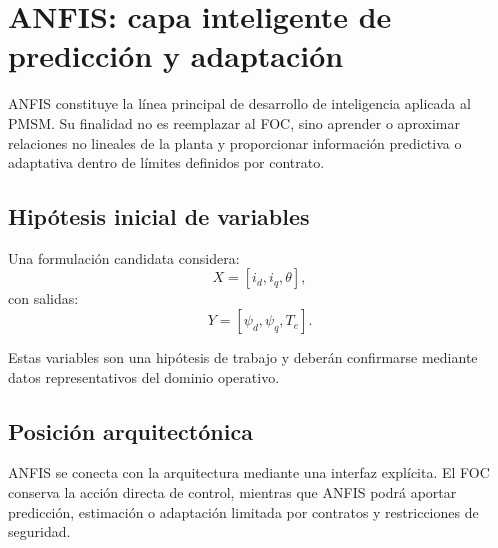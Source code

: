 \section{ANFIS: capa inteligente de predicción y adaptación}

ANFIS constituye la línea principal de desarrollo de inteligencia aplicada al PMSM. Su finalidad no es reemplazar al FOC, sino aprender o aproximar relaciones no lineales de la planta y proporcionar información predictiva o adaptativa dentro de límites definidos por contrato.

\subsection{Hipótesis inicial de variables}
Una formulación candidata considera:
\begin{equation}
X=[i_d,i_q,\theta],
\end{equation}
con salidas:
\begin{equation}
Y=[\psi_d,\psi_q,T_e].
\end{equation}

Estas variables son una hipótesis de trabajo y deberán confirmarse mediante datos representativos del dominio operativo.

\subsection{Posición arquitectónica}
ANFIS se conecta con la arquitectura mediante una interfaz explícita. El FOC conserva la acción directa de control, mientras que ANFIS podrá aportar predicción, estimación o adaptación limitada por contratos y restricciones de seguridad.
